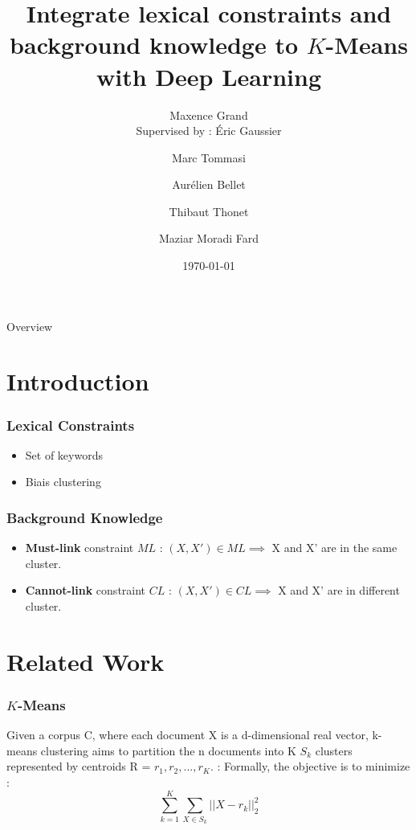 \documentclass{beamer}
\begin{document}
\title{Integrate lexical constraints and background knowledge to $K$-Means with Deep Learning}
\author{Maxence Grand \\                                                   
        Supervised by : \'Eric Gaussier  \and Marc Tommasi \and Aur\'elien Bellet \and Thibaut Thonet \and Maziar Moradi Fard} 
\date{\today}

\maketitle

\begin{frame}{Overview}
\tableofcontents
\end{frame}
\section{Introduction}

\begin{frame}
  \frametitle{Lexical Constraints}
  \pause
  \begin{itemize}
    \setlength\itemsep{2em}
  \item Set of keywords \pause
  \item Biais clustering
  \end{itemize}
\end{frame}
\begin{frame}
\frametitle{Background Knowledge}
\begin{itemize}
\pause
\item \textbf{Must-link} constraint $ML$ : $(X, X') \in ML \implies $ X and X' are in the
  same cluster.\pause
\item \textbf{Cannot-link} constraint $CL$ : $(X, X') \in CL \implies $ X and X' are in
  different cluster.
\end{itemize}
\end{frame}

\section{Related Work}

\begin{frame}
\frametitle{$K$-Means}
Given a corpus C, where each document X is a 
d-dimensional real vector, k-means clustering aims to partition the n 
documents into K $S_k$ clusters represented by centroids 
R = {$r_1, r_2, ..., r_K$}. :
Formally, the objective is to minimize :
$$
\sum_{k =1 }^K \sum_{X \in S_k} ||X - r_k||_2^2
$$
\end{frame}
\end{document}
